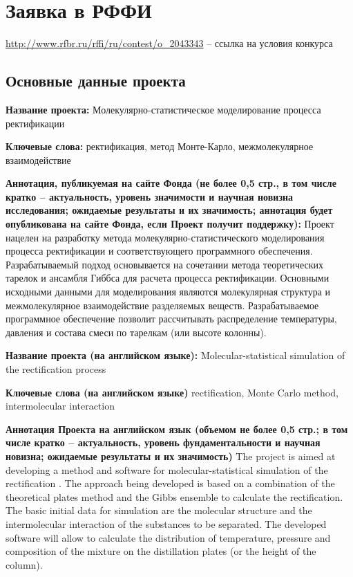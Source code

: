 \chapter{Заявка в РФФИ}
\url{ http://www.rfbr.ru/rffi/ru/contest/o_2043343} -- ссылка на условия конкурса

\section{Основные данные проекта}

\textbf{Название проекта:} Молекулярно-статистическое моделирование процесса ректификации

\textbf{Ключевые слова:} ректификация, метод Монте-Карло, межмолекулярное взаимодействие

\textbf{Аннотация, публикуемая на сайте Фонда (не более 0,5 стр., в том числе кратко – актуальность, уровень значимости и научная новизна исследования; ожидаемые результаты и их значимость; аннотация будет опубликована на сайте Фонда, если Проект получит поддержку):} 
Проект нацелен на разработку метода молекулярно-статистического моделирования процесса ректификации и соответствующего программного обеспечения. Разрабатываемый подход основывается на сочетании метода теоретических тарелок и ансамбля Гиббса для расчета процесса ректификации. Основными исходными данными для моделирования являются молекулярная структура и межмолекулярное взаимодействие разделяемых веществ. Разрабатываемое программное обеспечение позволит рассчитывать распределение температуры, давления и состава смеси по тарелкам (или высоте колонны). 

\textbf{Название проекта (на английском языке):} Molecular-statistical simulation of the rectification process

\textbf{Ключевые слова (на английском языке)} rectification, Monte Carlo method, intermolecular interaction


\textbf{Аннотация Проекта на английском язык (объемом не более 0,5 стр.; в том числе кратко – актуальность, уровень фундаментальности и научная новизна; ожидаемые результаты и их значимость)}
The project is aimed at developing a method and software for molecular-statistical simulation of the rectification . The approach being developed is based on a combination of the theoretical plates method  and the Gibbs ensemble to calculate the rectification. The basic initial data for simulation are the molecular structure and the intermolecular interaction of the substances to be separated. The developed software will allow to calculate the distribution of temperature, pressure and composition of the mixture on the distillation plates (or the height of the column).


